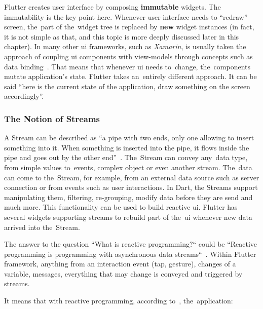 Flutter creates user interface by composing \textbf{immutable} widgets. The immutability is the key point here. Whenever user interface needs to ``redraw'' screen, the~part of the~widget tree is replaced by \textbf{new} widget instances (in fact, it is not simple as that, and this topic is more deeply discussed later in this chapter). In many other \gls{ui} frameworks, such as \textit{Xamarin}, is usually taken the approach of coupling \gls{ui} components with view-models through concepts such as data binding~\cite{xamarin-data-binding}. That means that whenever \gls{ui} needs to~change, the~components mutate application's state. Flutter takes an~entirely different approach. It can be said ``here is the current state of the application, draw something on the screen accordingly''.

\subsubsection{The Notion of Streams}
A Stream can be described as ``a pipe with two ends, only one allowing to insert something into it. When something is inserted into the pipe, it flows inside the pipe and goes out by the other end''~\cite{reactive-didier}. The~Stream can convey any~data type, from simple values to~events, complex object or even another stream. The~data can come to the~Stream, for example, from an external data source such as server connection or from events such as user interactions. In Dart, the Streams support manipulating them, filtering, re-grouping, modify data before they are send and much more. This functionality can be used to build reactive \gls{ui}. Flutter has several widgets supporting streams to rebuild part of the~\gls{ui} whenever new data arrived into the~Stream.

The answer to the question ``What is reactive programming?`` could be ``Reactive programming is programming with asynchronous data streams``~\cite{reactive-didier}\cite{reactive-red-hat}. Within Flutter framework, anything from an interaction event (tap, gesture), changes of a variable, messages, everything that may change is conveyed and triggered by streams.

It means that with reactive programming, according to~\cite{reactive-didier}, the~application:

